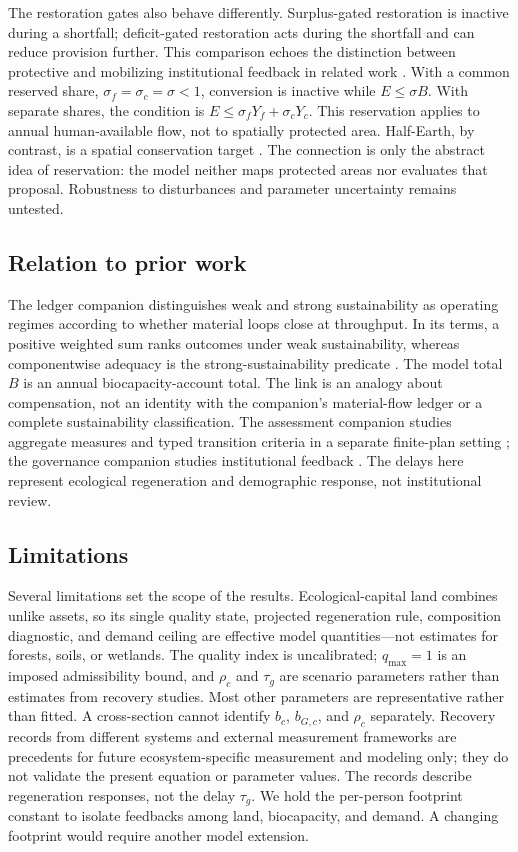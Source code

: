 \documentclass[preprint,12pt,authoryear]{elsarticle}
\begin{document}
The restoration gates also behave differently. Surplus-gated restoration is inactive during a shortfall; deficit-gated restoration acts during the shortfall and can reduce provision further. This comparison echoes the distinction between protective and mobilizing institutional feedback in related work \citep{Abaee2026a}. With a common reserved share, $\sigma_f=\sigma_c=\sigma<1$, conversion is inactive while $E\le\sigma B$. With separate shares, the condition is $E\le\sigma_fY_f+\sigma_cY_c$. This reservation applies to annual human-available flow, not to spatially protected area. Half-Earth, by contrast, is a spatial conservation target \citep{Wilson2016}. The connection is only the abstract idea of reservation: the model neither maps protected areas nor evaluates that proposal. Robustness to disturbances and parameter uncertainty remains untested.

\subsection{Relation to prior work}

The ledger companion distinguishes weak and strong sustainability as operating regimes according to whether material loops close at throughput. In its terms, a positive weighted sum ranks outcomes under weak sustainability, whereas componentwise adequacy is the strong-sustainability predicate \citep{Abaee2026c}. The model total $B$ is an annual biocapacity-account total. The link is an analogy about compensation, not an identity with the companion's material-flow ledger or a complete sustainability classification. The assessment companion studies aggregate measures and typed transition criteria in a separate finite-plan setting \citep{Abaee2026b}; the governance companion studies institutional feedback \citep{Abaee2026a}. The delays here represent ecological regeneration and demographic response, not institutional review.

\subsection{Limitations}

Several limitations set the scope of the results. Ecological-capital land combines unlike assets, so its single quality state, projected regeneration rule, composition diagnostic, and demand ceiling are effective model quantities—not estimates for forests, soils, or wetlands. The quality index is uncalibrated; $q_{\max}=1$ is an imposed admissibility bound, and $\rho_c$ and $\tau_g$ are scenario parameters rather than estimates from recovery studies. Most other parameters are representative rather than fitted. A cross-section cannot identify $b_c$, $b_{G,c}$, and $\rho_c$ separately. Recovery records from different systems and external measurement frameworks are precedents for future ecosystem-specific measurement and modeling only; they do not validate the present equation or parameter values. The records describe regeneration responses, not the delay $\tau_g$. We hold the per-person footprint constant to isolate feedbacks among land, biocapacity, and demand. A changing footprint would require another model extension.
\end{document}
